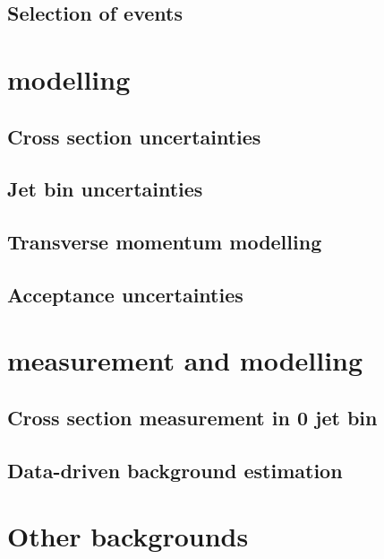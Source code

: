 \documentclass[hyper,linkcolor=blue]{mythesis}
\begin{document}
\begin{mainmatter}
    \section{Selection of \HWW events}
      \label{sec:signalregions}
      

  \chapter{\ggH modelling}
    \label{chap:signal}
    
    \section{Cross section uncertainties}
      \label{sec:ggf_xs}
      
    \section{Jet bin uncertainties}
      \label{sec:ggf_jetbin}
      
    \section{Transverse momentum modelling}
      \label{sec:ggf_pt}
      
    \section{Acceptance uncertainties}
      \label{sec:ggf_acc}
      

  \chapter{\WW measurement and modelling}
    \label{chap:ww}
    
    \section{Cross section measurement in 0 jet bin}
      \label{sec:ww_meas}
      
    \section{Data-driven background estimation}
      \label{sec:ww_bkg}
      

  \chapter{Other backgrounds}
    \label{chap:backgrounds}
    

\end{mainmatter}
\end{document}
